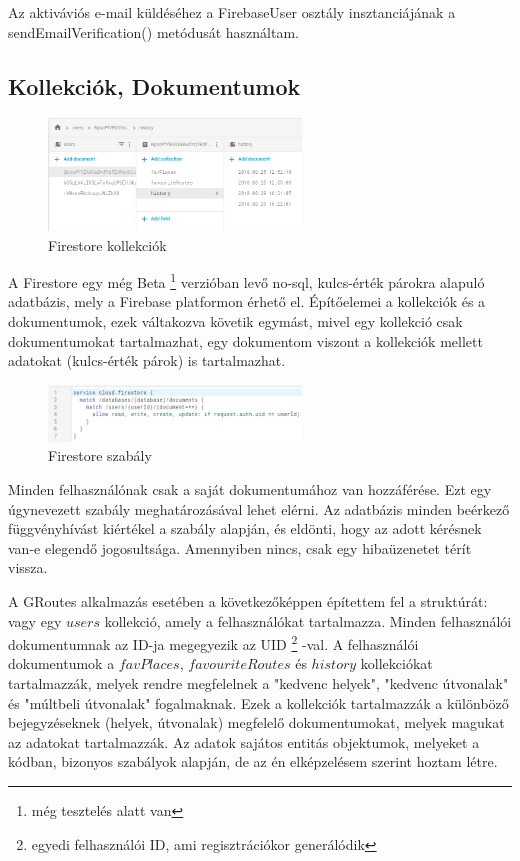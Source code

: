 Az aktiváviós e-mail küldéséhez a FirebaseUser osztály insztanciájának a sendEmailVerification() metódusát használtam.

\subsection{Kollekciók, Dokumentumok}

\begin{figure}
	\centering
	\setlength{\abovecaptionskip}{0pt}
	\setlength{\belowcaptionskip}{0pt}
	\includegraphics[width=0.6\textwidth]{images/firestore_colls}
	\caption{Firestore kollekciók\label{fig:ALAP:sm2}}
\end{figure}

A Firestore egy még Beta%
\footnote{ %
	még tesztelés alatt van
}  %
 verzióban levő no-sql, kulcs-érték párokra alapuló adatbázis, mely a Firebase platformon érhető el. Építőelemei a kollekciók és a dokumentumok, ezek váltakozva követik egymást, mivel egy kollekció csak dokumentumokat tartalmazhat, egy dokumentom viszont a kollekciók mellett adatokat (kulcs-érték párok) is tartalmazhat. 
 
 \begin{figure}
 	\centering
 	\setlength{\abovecaptionskip}{0pt}
 	\setlength{\belowcaptionskip}{0pt}
 	\includegraphics[width=0.6\textwidth]{images/firestore_rule}
 	\caption{Firestore szabály\label{fig:ALAP:sm2}}
 \end{figure}
 
Minden felhasználónak csak a saját dokumentumához van hozzáférése. Ezt egy úgynevezett szabály meghatározásával lehet elérni. Az adatbázis minden beérkező függvényhívást kiértékel a szabály alapján, és eldönti, hogy az adott kérésnek van-e elegendő jogosultsága. Amennyiben nincs, csak egy hibaüzenetet térít vissza.

 A GRoutes alkalmazás esetében a következőképpen építettem fel a struktúrát: vagy egy \(users\) kollekció, amely a felhasználókat tartalmazza. Minden felhasználói dokumentumnak az ID-ja megegyezik az UID%
\footnote{ %
	egyedi felhasználói ID, ami regisztrációkor generálódik
}  %
-val. A felhasználói dokumentumok a \(favPlaces\), \(favouriteRoutes\) és \(history\) kollekciókat tartalmazzák, melyek rendre megfelelnek a "kedvenc helyek", "kedvenc útvonalak" és "múltbeli útvonalak" fogalmaknak. Ezek a kollekciók tartalmazzák a különböző bejegyzéseknek (helyek, útvonalak) megfelelő dokumentumokat, melyek magukat az adatokat tartalmazzák. Az adatok sajátos entitás objektumok, melyeket a kódban, bizonyos szabályok alapján, de az én elképzelésem szerint hoztam létre. 


